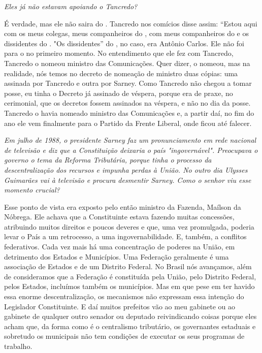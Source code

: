 \medskip

\noindent\emph{Eles já não estavam apoiando o Tancredo?}

É verdade, mas ele não saira do . Tancredo nos
comícios disse assim: ``Estou aqui com os meus colegas, meus
companheiros do , com meus companheiros do  e os dissidentes do
. "Os dissidentes'' do , no caso, era Antônio Carlos. Ele não foi
para o  no primeiro momento. No entendimento que ele fez com
Tancredo, Tancredo o nomeou ministro das Comunicações. Quer dizer, o
nomeou, mas na realidade, nós temos no decreto de nomeação de ministro
duas cópias: uma assinada por Tancredo e outra por Sarney. Como Tancredo
não chegou a tomar posse, eu tinha o Decreto já assinado de véspera,
porque era de praxe, no cerimonial, que os decretos fossem assinados na
véspera, e não no dia da posse. Tancredo o havia nomeado ministro das
Comunicações e, a partir daí, no fim do ano ele vem finalmente para o
Partido da Frente Liberal, onde ficou até falecer.

\medskip

\noindent\emph{Em julho de 1988, o presidente Sarney faz um pronunciamento em
rede nacional de televisão e diz que a Constituição deixaria o país
"ingovernável". Preocupava o governo o tema da Reforma Tributária,
porque tinha o processo da descentralização dos recursos e impunha
perdas à União. No outro dia Ulysses Guimarães vai à televisão e procura
desmentir Sarney. Como o senhor viu esse momento crucial? }

Esse ponto de vista era exposto pelo então ministro da
Fazenda, Maílson da Nóbrega. Ele achava que a Constituinte estava
fazendo muitas concessões, atribuindo muitos direitos e poucos deveres e
que, uma vez promulgada, poderia levar o País a um retrocesso, a uma
ingovernabilidade. E, também, a conflitos federativos. Cada vez mais há
uma concentração de poderes na União, em detrimento dos Estados e
Municípios. Uma Federação geralmente é uma associação de Estados e de um
Distrito Federal. No Brasil nós avançamos, além de consideramos que a
Federação é constituída pela União, pelo Distrito Federal, pelos
Estados, incluímos também os municípios. Mas em que pese em ter havido
essa enorme descentralização, os mecanismos não expressam essa intenção
do Legislador Constituinte. E daí muitos prefeitos vão ao meu gabinete
ou ao gabinete de qualquer outro senador ou deputado reivindicando
coisas porque eles acham que, da forma como é o centralismo tributário,
os governantes estaduais e sobretudo os municipais não tem condições de
executar os seus programas de trabalho.

